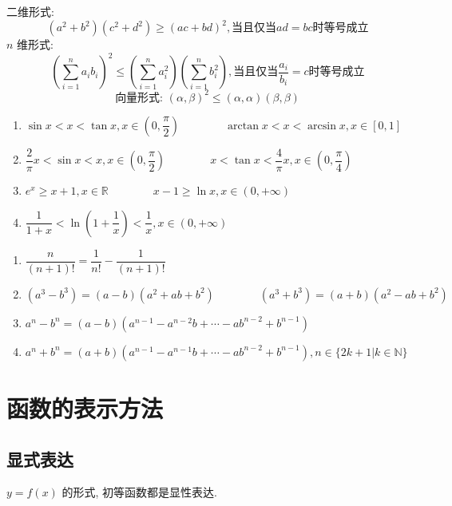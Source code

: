 \begin{theorem}[柯西不等式]
	二维形式:
	$$(a^{2}+b^{2})(c^{2}+d^{2})\geq (ac+bd)^{2}, \text{当且仅当} ad =bc \text{时等号成立}$$
	$n$ 维形式:
	$$\left(\sum_{i=1}^{n}a_{i}b_{i}\right)^{2}\leq \left(\sum_{i=1}^{n}a_{i}^{2}\right)\left(\sum_{i=1}^{n}b_{i}^{2}\right),\text{当且仅当} \dfrac{a_{i}}{b_{i}}=c\text{时等号成立}$$
	$$\text{向量形式: } (\alpha,\beta)^{2}\leq (\alpha,\alpha)(\beta,\beta)$$
\end{theorem}
\begin{theorem}[重要不等式]
	\begin{enumerate}
		\item $\sin x < x < \tan x, x\in (0,\dfrac{\pi}{2})\qquad \qquad \arctan x < x < \arcsin x, x\in[0,1]$
		\item $\dfrac{2}{\pi}x < \sin x < x, x\in(0,\dfrac{\pi}{2})\qquad \qquad x < \tan x < \dfrac{4}{\pi}x , x\in(0,\dfrac{\pi}{4})$
		\item $e^{x} \geq x + 1,x\in\mathbb{R}\qquad \qquad x-1 \geq \ln x, x\in(0,+\infty)$
		\item $\dfrac{1}{1+x} < \ln (1+\dfrac{1}{x}) < \dfrac{1}{x}, x\in(0,+\infty)$
	\end{enumerate}
\end{theorem}

\begin{theorem}[重要公式]
	\begin{enumerate}
		\item $\dfrac{n}{(n+1)!} = \dfrac{1}{n!} - \dfrac{1}{(n+1)!}$
		\item $(a^{3}-b^{3}) = (a-b)(a^{2}+ab+b^{2})\qquad\qquad (a^{3}+b^{3}) = (a+b)(a^{2}-ab+b^{2})$
		\item $a^{n} - b^{n} = (a-b)(a^{n-1}-a^{n-2}b+\cdots -ab^{n-2}+b^{n-1})$
		\item $a^{n} + b^{n} = (a+b)(a^{n-1}-a^{n-1}b+\cdots -ab^{n-2} +b^{n-1}), n\in \{2k+1 | k\in \mathbb{N}\}$
	\end{enumerate}
\end{theorem}

\section{函数的表示方法}
\subsection{显式表达}
\begin{definition}[显示表达]
	$y = f(x)$ 的形式, 初等函数都是显性表达.
\end{definition}
